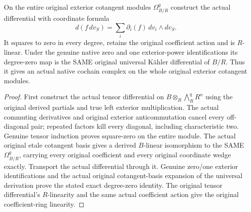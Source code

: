 \begin{theorem}
\label{lem:cartier-etale-original-exterior-complex}
\leanok
On the entire original exterior cotangent modules $\Omega^q_{B/R}$ construct
the actual differential with coordinate formula
\[
 d(f\,d v_S)=\sum_i\partial_i(f)\,d v_i\wedge d v_S.
\]
It squares to zero in every degree, retains the original coefficient action
and is $R$-linear. Under the genuine native zero and one exterior-power
identifications its degree-zero map is the SAME original universal K\"ahler
differential of $B/R$. Thus it gives an actual native cochain complex on the
whole original exterior cotangent modules.
\end{theorem}
\begin{proof}
First construct the actual tensor differential on
$B\otimes_R\bigwedge^q_R R^n$ using the original derived partials and true
left exterior multiplication. The actual commuting derivatives and original
exterior anticommutation cancel every off-diagonal pair; repeated factors kill
every diagonal, including characteristic two. Genuine tensor induction proves
square-zero on the entire module.
The actual original etale cotangent basis gives a derived $B$-linear
isomorphism to the SAME $\Omega^q_{B/R}$, carrying every original coefficient
and every original coordinate wedge exactly. Transport the actual differential
through it. Genuine zero/one exterior identifications and the actual original
cotangent-basis expansion of the universal derivation prove the stated exact
degree-zero identity. The original tensor differential's $R$-linearity and the
same actual coefficient action give the original coefficient-ring linearity.
\end{proof}

